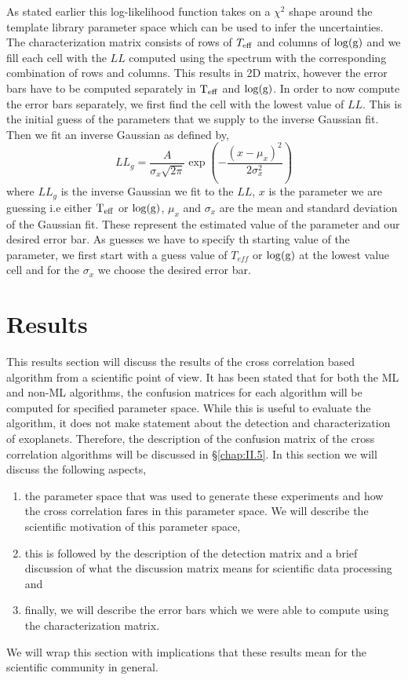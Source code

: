 As stated earlier this log-likelihood function takes on a $\chi^2$ shape around the template library parameter space which can be used to infer the uncertainties. 
The characterization matrix consists of rows of $T_{\rm{eff}}$ and columns of $\rm{\log(g)}$ and we fill each cell with the $LL$ computed using the spectrum with the corresponding combination of rows and columns.
This results in 2D matrix, however the error bars have to be computed separately in $\rm{T_{eff}}$ and $\rm{\log(g)}$.
In order to now compute the error bars separately, we first find the cell with the lowest value of $LL$.
This is the initial guess of the parameters that we supply to the inverse Gaussian fit.
Then we fit an inverse Gaussian as defined by,
\begin{equation}
    LL_{g} = \dfrac{A}{\sigma_{x}\sqrt{2\pi}}\exp{\left(-\dfrac{(x-\mu_x)^2}{2\sigma_{x}^2}\right)}
    \label{eq: gaussian fit LL}
\end{equation}
where $LL_g$ is the inverse Gaussian we fit to the $LL$, $x$ is the parameter we are guessing i.e either $\rm{T_{eff}}$ or $\rm{\log(g)}$,
$\mu_x$ and $\sigma_x$ are the mean and standard deviation of the Gaussian fit.
These represent the estimated value of the parameter and our desired error bar.
As guesses we have to specify th starting value of the parameter, we first start with a guess value of $T_{eff}$ or $\rm{\log(g)}$ at the lowest value cell and for the $\sigma_x$ we choose the desired error bar.

\section{Results}
This results section will discuss the results of the cross correlation based algorithm from a scientific point of view.
It has been stated that for both the ML and non-ML algorithms, the confusion matrices for each algorithm will be computed for specified parameter space. 
While this is useful to evaluate the algorithm, it does not make statement about the detection and characterization of exoplanets.
Therefore, the description of the confusion matrix of the cross correlation algorithms will be discussed in \S\ref{chap:II.5}.
In this section we will discuss the following aspects,
\begin{enumerate}
    \item the parameter space that was used to generate these experiments and how the cross correlation fares in this parameter space. We will describe the scientific motivation of this parameter space, 
    \item this is followed by the description of the detection matrix and a brief discussion of what the discussion matrix means for scientific data processing and
    \item finally, we will describe the error bars which we were able to compute using the characterization matrix.
\end{enumerate}
We will wrap this section with implications that these results mean for the scientific community in general.
